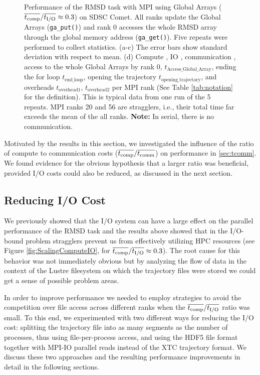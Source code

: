 \begin{figure}[ht!]
\caption{Performance of the RMSD task with MPI using Global Arrays ($\overline{{t}_{\text{comp}}}/\overline{{t}_{\text{I/O}}} \approx 0.3$) on SDSC Comet.
All ranks update the Global Arrays (\texttt{ga\_put()}) and rank 0 accesses the whole RMSD array through the global memory address (\texttt{ga\_get()}).
Five repeats were performed to collect statistics. (a-c) The error bars show standard deviation with respect to mean. 
(d) Compute \tcomp, IO \tIO, communication \tcomm, access to the whole Global Arrays by rank 0, $t_{\text{Access\_Global\_Array}}$, ending the for loop $t_{\text{end\_loop}}$,
  opening the trajectory $t_{\text{opening\_trajectory}}$, and overheads $t_{\text{overhead1}}$, $t_{\text{overhead2}}$ per MPI rank (See Table \ref{tab:notation} for the definition). 
  This is typical data from one run of the 5 repeats. MPI ranks 20 and 56 are stragglers, i.e., 
their total time far exceeds the mean of the all ranks. \textbf{Note:} In serial, there is no communication.}
\label{fig:MPIwithIO-ga4py}
\end{figure}

Motivated by the results in this section, we investigated the influence of the ratio of compute to communication costs ($\overline{{t}_{\text{comp}}}/\overline{t_{\text{comm}}}$) on performance in \ref{sec:tcomm}.
We found evidence for the obvious hypothesis that a larger ratio was beneficial, provided I/O costs could also be reduced, as discussed in the next section.

\subsection{Reducing I/O Cost}
\label{sec:I/O}

We previously showed that the I/O system can have a large effect on the parallel performance of the RMSD task \cite{Khoshlessan:2017ab} and the results above showed that in the I/O-bound problem stragglers prevent us from effectively utilizing HPC resources (see Figure \ref{fig:ScalingComputeIO}, for $\overline{{t}_{\text{comp}}}/\overline{{t}_{\text{I/O}}} \approx 0.3$).
The root cause for this behavior was not immediately obvious but by analyzing the flow of data in the context of the Lustre filesystem on which the trajectory files were stored  we could get a sense of possible problem areas.

In order to improve performance we needed to employ strategies to avoid the competition over file access across different ranks when the $\overline{{t}_{\text{comp}}}/\overline{{t}_{\text{I/O}}}$ ratio was small.
To this end, we experimented with two different ways for reducing the I/O cost:
splitting the trajectory file into as many segments as the number of processes, thus using file-per-process access, and using the HDF5 file format together with MPI-IO parallel reads instead of the XTC trajectory format.
We discuss these two approaches and the resulting performance improvements in detail in the following sections.

